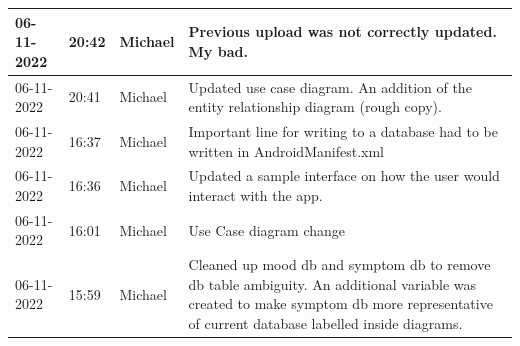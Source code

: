 \documentclass[11pt]{article}
\begin{document}
\begin{center}
\begin{longtable}{|p{2cm}|l|p{2cm}|p{10.5cm}|}
            06-11-2022                                 & 20:42                              & Michael                                 & Previous upload was not correctly updated. My bad.                                                                                                                                                                                                                                                           \\ \hline
            06-11-2022                                 & 20:41                              & Michael                                 & Updated use case diagram. An addition of the entity relationship diagram (rough copy).                                                                                                                                                                                                                       \\ \hline
            06-11-2022                                 & 16:37                              & Michael                                 & Important line for writing to a database had to be written in AndroidManifest.xml                                                                                                                                                                                                                            \\ \hline
            06-11-2022                                 & 16:36                              & Michael                                 & Updated a sample interface on how the user would interact with the app.                                                                                                                                                                                                                                      \\ \hline
            06-11-2022                                 & 16:01                              & Michael                                 & Use Case diagram change                                                                                                                                                                                                                                                                                      \\ \hline
            06-11-2022                                 & 15:59                              & Michael                                 & Cleaned up mood db and symptom db to remove db table ambiguity. An additional variable was created to make symptom db more representative of current database labelled inside diagrams.                                                                                                                      \\ \hline

\end{longtable}
\end{center}
\end{document}
